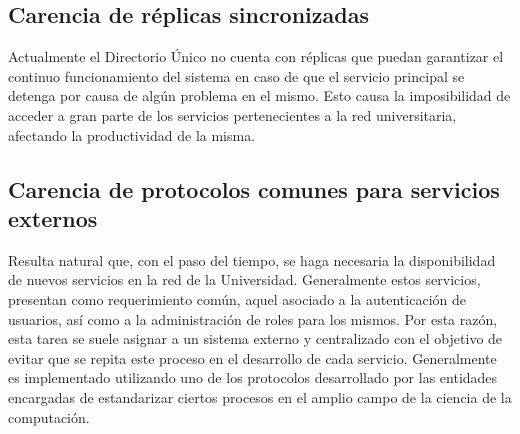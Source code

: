 \subsection{Carencia de r\'eplicas sincronizadas }

Actualmente el Directorio \'Unico no cuenta con r\'eplicas que puedan garantizar el continuo funcionamiento del sistema en caso de que el servicio principal se detenga por causa de alg\'un problema en el mismo. Esto causa la imposibilidad de acceder a gran parte de los servicios pertenecientes a la red universitaria, afectando la productividad de la misma.

\subsection{Carencia de protocolos comunes para servicios externos}

Resulta natural que, con el paso del tiempo, se haga necesaria la disponibilidad de nuevos servicios en la red de la Universidad. Generalmente estos servicios, presentan como requerimiento com\'un, aquel asociado a la autenticaci\'on de usuarios, as\'i como a la administraci\'on de roles para los mismos. Por esta raz\'on, esta tarea se suele asignar a un sistema externo y centralizado con el objetivo de evitar que se repita este proceso en el desarrollo de cada servicio. Generalmente es implementado utilizando uno de los protocolos desarrollado por las entidades encargadas de estandarizar ciertos procesos en el amplio campo de la ciencia de la computaci\'on.





